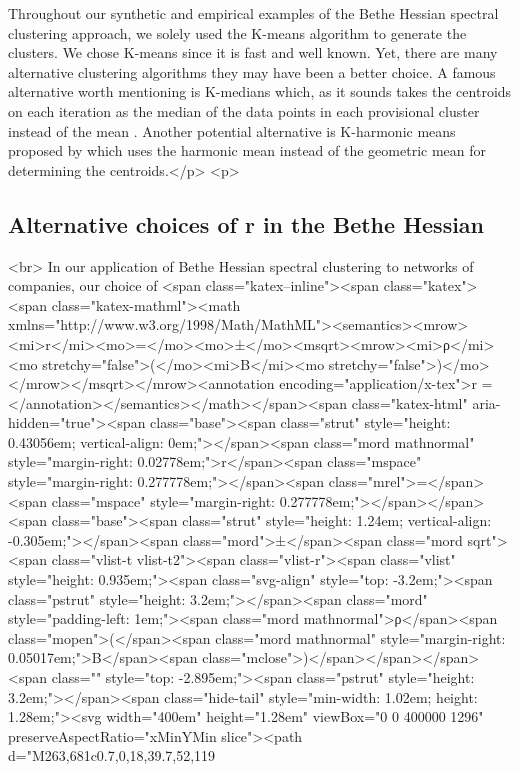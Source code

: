 Throughout our synthetic and empirical examples of the Bethe Hessian spectral clustering approach, we solely used the K-means algorithm to generate the clusters. We chose K-means since it is fast and well known. Yet, there are many alternative clustering algorithms they may have been a better choice. A famous alternative worth mentioning is K-medians which, as it sounds takes the centroids on each iteration as the median of the data points in each provisional cluster instead of the mean \cite{MacQueen1967}. Another potential alternative is K-harmonic means proposed by \cite{zhang1999k} which uses the harmonic mean instead of the geometric mean for determining the centroids.</p>
<p>\subsection{Alternative choices of r in the Bethe Hessian}<br>
In our application of Bethe Hessian spectral clustering to networks of companies, our choice of <span class="katex--inline"><span class="katex"><span class="katex-mathml"><math xmlns="http://www.w3.org/1998/Math/MathML"><semantics><mrow><mi>r</mi><mo>=</mo><mo>±</mo><msqrt><mrow><mi>ρ</mi><mo stretchy="false">(</mo><mi>B</mi><mo stretchy="false">)</mo></mrow></msqrt></mrow><annotation encoding="application/x-tex">r = \pm{}</annotation></semantics></math></span><span class="katex-html" aria-hidden="true"><span class="base"><span class="strut" style="height: 0.43056em; vertical-align: 0em;"></span><span class="mord mathnormal" style="margin-right: 0.02778em;">r</span><span class="mspace" style="margin-right: 0.277778em;"></span><span class="mrel">=</span><span class="mspace" style="margin-right: 0.277778em;"></span></span><span class="base"><span class="strut" style="height: 1.24em; vertical-align: -0.305em;"></span><span class="mord">±</span><span class="mord sqrt"><span class="vlist-t vlist-t2"><span class="vlist-r"><span class="vlist" style="height: 0.935em;"><span class="svg-align" style="top: -3.2em;"><span class="pstrut" style="height: 3.2em;"></span><span class="mord" style="padding-left: 1em;"><span class="mord mathnormal">ρ</span><span class="mopen">(</span><span class="mord mathnormal" style="margin-right: 0.05017em;">B</span><span class="mclose">)</span></span></span><span class="" style="top: -2.895em;"><span class="pstrut" style="height: 3.2em;"></span><span class="hide-tail" style="min-width: 1.02em; height: 1.28em;"><svg width="400em" height="1.28em" viewBox="0 0 400000 1296" preserveAspectRatio="xMinYMin slice"><path d="M263,681c0.7,0,18,39.7,52,119
